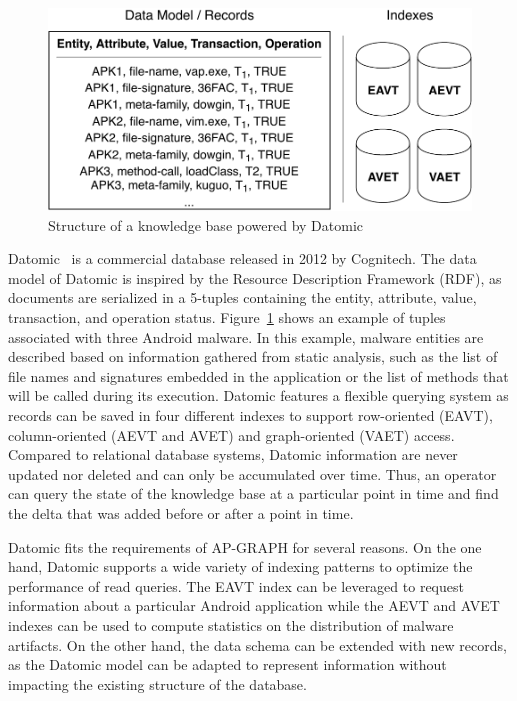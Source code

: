 \begin{figure}[!ht]
        \centering
	\includegraphics[width=0.75\linewidth]{figures/apgraph/architectures/datomic.pdf}
	\caption{Structure of a knowledge base powered by Datomic}
	\label{figure:apgraph:architectures:datomic}
\end{figure}

Datomic~\cite{cognitech_datomic_nodate} is a commercial database released in 2012 by Cognitech.
The data model of Datomic is inspired by the Resource Description Framework (RDF), as documents are serialized in a 5-tuples containing the entity, attribute, value, transaction, and operation status.
Figure~\ref{figure:apgraph:architectures:datomic} shows an example of tuples associated with three Android malware.
In this example, malware entities are described based on information gathered from static analysis, such as the list of file names and signatures embedded in the application or the list of methods that will be called during its execution.
Datomic features a flexible querying system as records can be saved in four different indexes to support row-oriented (EAVT), column-oriented (AEVT and AVET) and graph-oriented (VAET) access.
Compared to relational database systems, Datomic information are never updated nor deleted and can only be accumulated over time.
Thus, an operator can query the state of the knowledge base at a particular point in time and find the delta that was added before or after a point in time.

Datomic fits the requirements of AP-GRAPH for several reasons.
On the one hand, Datomic supports a wide variety of indexing patterns to optimize the performance of read queries.
The EAVT index can be leveraged to request information about a particular Android application while the AEVT and AVET indexes can be used to compute statistics on the distribution of malware artifacts.
On the other hand, the data schema can be extended with new records, as the Datomic model can be adapted to represent information without impacting the existing structure of the database.

